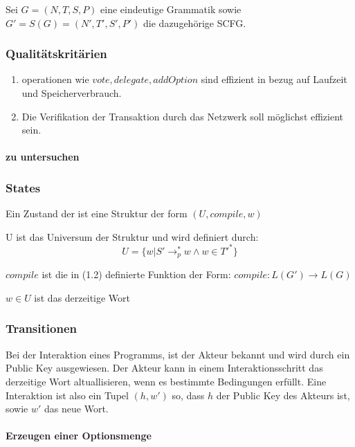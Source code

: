 \documentclass[]{article}
\begin{document}
Sei $G = (N,T,S,P)$ eine eindeutige Grammatik sowie
$G'=S(G)=(N',T',S',P')$ die dazugehörige SCFG.


\subsubsection{Qualitätskritärien}

\begin{enumerate}
  \item operationen wie $vote, delegate, addOption$ sind effizient in bezug auf Laufzeit und Speicherverbrauch.
  \item Die Verifikation der Transaktion durch das Netzwerk soll möglichst effizient sein.
\end{enumerate}
\paragraph{zu untersuchen}

\subsubsection{States}

Ein Zustand der  ist eine Struktur der form $(U, compile, w)$

U ist das Universum der Struktur und wird definiert durch:
\[U=\{w\vert S'\rightarrow_p^* w \land w\in T'^*\}\]

$compile$ ist die in (1.2) definierte Funktion der Form:
$compile: L(G') \rightarrow L(G)$

$w\in U$ ist das derzeitige Wort

\subsubsection{Transitionen}

Bei der Interaktion eines Programms, ist der Akteur bekannt und wird
durch ein Public Key ausgewiesen. Der Akteur kann in einem
Interaktionsschritt das derzeitige Wort altuallisieren, wenn es
bestimmte Bedingungen erfüllt. Eine Interaktion ist also ein Tupel
$(h,w')$ so, dass $h$ der Public Key des Akteurs ist, sowie $w'$ das
neue Wort.


\paragraph{Erzeugen einer Optionsmenge}
\end{document}
